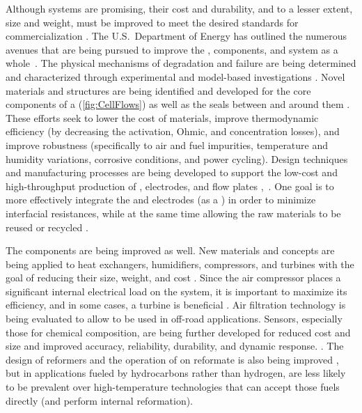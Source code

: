 Although  systems are promising, their cost and durability, and to a lesser extent, size and weight, must be improved to meet the desired standards for commercialization \cite[p.~11]{DOE2007}.  The U.S.\ Department of Energy has outlined the numerous avenues that are being pursued to improve the ,  components, and  system as a whole~\cite{DOE2007}.  The physical mechanisms of  degradation and failure are being determined and characterized through experimental and model-based investigations \cite[pp.~3, 9, 32, \& 40]{DOE2007}.  Novel materials and structures are being identified and developed for the core components of a  (\autoref{fig:CellFlows}) as well as the seals between and around them \cite[pp.~4--7]{DOE2007}.  These efforts seek to lower the cost of materials, improve thermodynamic efficiency (by decreasing the activation, Ohmic, and concentration losses), and improve robustness (specifically to air and fuel impurities, temperature and humidity variations, corrosive conditions, and power cycling).   Design techniques and manufacturing processes are being developed to support the low-cost and high-throughput production of , electrodes, and flow plates \cite[pp.~2, 5--6, \& 29--30]{DOE2007},~\cite{Ding2010}.   One goal is to more effectively integrate the  and electrodes (as a ) in order to minimize interfacial resistances, while at the same time allowing the raw materials to be reused or recycled \cite[pp.~3--10]{DOE2007}.

The  components are being improved as well.  New materials and  concepts are being applied to heat exchangers, humidifiers, compressors, and turbines with the goal of reducing their size, weight, and cost \cite[pp.~7, 10, \& 32]{DOE2007}.  Since the air compressor places a significant internal electrical load on the  system, it is important to maximize its efficiency, and in some cases, a turbine is beneficial \cite[p.~102]{Larminie2003}.  Air filtration technology is being evaluated to allow  to be used in off-road applications.  Sensors, especially those for chemical composition, are being further developed for reduced cost and size and improved accuracy, reliability, durability, and dynamic response. \cite[pp.~7]{DOE2007}.  The design of reformers and the operation of  on reformate is also being improved \cite[pp.~8--9]{DOE2007}, but in applications fueled by hydrocarbons rather than hydrogen,  are less likely to be prevalent over high-temperature  technologies that can accept those fuels directly (and perform internal
reformation).

